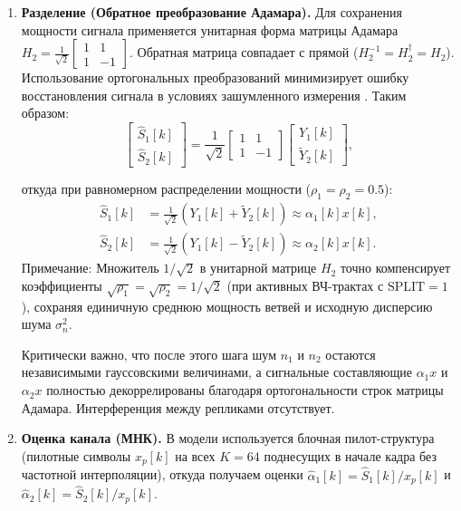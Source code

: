 \documentclass[a4paper,12pt]{article}
\numberwithin{equation}{section}
\begin{document}
\begin{enumerate}
    \item \textbf{Разделение (Обратное преобразование Адамара).} Для сохранения мощности сигнала применяется унитарная форма матрицы Адамара $H_2 = \frac{1}{\sqrt{2}}\begin{bmatrix} 1 & 1 \\ 1 & -1 \end{bmatrix}$. Обратная матрица совпадает с прямой ($H_2^{-1} = H_2^\dagger = H_2$). Использование ортогональных преобразований минимизирует ошибку восстановления сигнала в условиях зашумленного измерения \cite{tropp}. Таким образом:
    \begin{equation}
    \begin{bmatrix} \hat{S}_1[k] \\ \hat{S}_2[k] \end{bmatrix} =\frac{1}{\sqrt{2}}\begin{bmatrix} 1 & 1 \\ 1 & -1 \end{bmatrix}\begin{bmatrix} Y_1[k] \\ \tilde{Y}_2[k] \end{bmatrix},\label{eq:hadamard}
    \end{equation}

    откуда при равномерном распределении мощности ($\rho_1 = \rho_2 = 0.5$):
    \begin{align}
    \hat{S}_1[k] &= \frac{1}{\sqrt{2}} \left( Y_1[k] + \tilde{Y}_2[k] \right) \approx \alpha_1[k] x[k], \\
    \hat{S}_2[k] &= \frac{1}{\sqrt{2}} \left( Y_1[k] - \tilde{Y}_2[k] \right) \approx \alpha_2[k] x[k].
    \end{align}
    Примечание: Множитель $1/\sqrt{2}$ в унитарной матрице $H_2$ точно компенсирует коэффициенты $\sqrt{\rho_1}=\sqrt{\rho_2}=1/\sqrt{2}$ (при активных ВЧ-трактах с $\text{SPLIT}=1$), сохраняя единичную среднюю мощность ветвей и исходную дисперсию шума $\sigma_n^2$.

    Критически важно, что после этого шага шум $n_1$ и $n_2$ остаются независимыми гауссовскими величинами, а сигнальные составляющие $\alpha_1 x$ и $\alpha_2 x$ полностью декоррелированы благодаря ортогональности строк матрицы Адамара. Интерференция между репликами отсутствует.
    
    \item \textbf{Оценка канала (МНК).} В модели используется блочная пилот-структура (пилотные символы $x_p[k]$ на всех $K=64$ поднесущих в начале кадра без частотной интерполяции), откуда получаем оценки $\hat{\alpha}_1[k] = \hat{S}_1[k] / x_p[k]$ и $\hat{\alpha}_2[k] = \hat{S}_2[k] / x_p[k]$. 
    

\end{enumerate}
\end{document}

